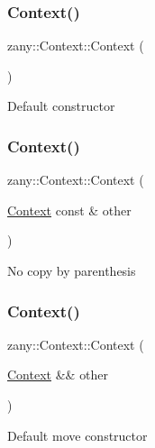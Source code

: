 \subsubsection{\texorpdfstring{Context()}{Context()}\hspace{0.1cm}{\footnotesize\ttfamily [1/3]}}
{\footnotesize\ttfamily zany\+::\+Context\+::\+Context (\begin{DoxyParamCaption}{ }\end{DoxyParamCaption})\hspace{0.3cm}{\ttfamily [default]}}

Default constructor \mbox{\label{classzany_1_1_context_aaf02dd357e71f0608f6c034c5222930c}} 
\subsubsection{\texorpdfstring{Context()}{Context()}\hspace{0.1cm}{\footnotesize\ttfamily [2/3]}}
{\footnotesize\ttfamily zany\+::\+Context\+::\+Context (\begin{DoxyParamCaption}\item[{\hyperlink{classzany_1_1_context}{Context} const \&}]{other }\end{DoxyParamCaption})\hspace{0.3cm}{\ttfamily [delete]}}

No copy by parenthesis \mbox{\label{classzany_1_1_context_a0f3ea7fa76d75e239ac8ec95a517822e}} 
\subsubsection{\texorpdfstring{Context()}{Context()}\hspace{0.1cm}{\footnotesize\ttfamily [3/3]}}
{\footnotesize\ttfamily zany\+::\+Context\+::\+Context (\begin{DoxyParamCaption}\item[{\hyperlink{classzany_1_1_context}{Context} \&\&}]{other }\end{DoxyParamCaption})\hspace{0.3cm}{\ttfamily [default]}}

Default move constructor 

